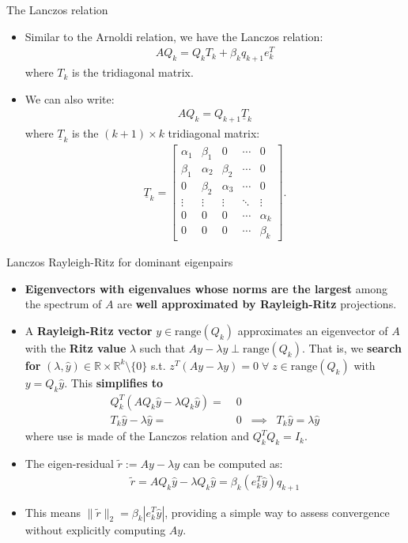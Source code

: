 \documentclass[t,usepdftitle=false]{beamer}
\begin{document}
\begin{frame}{The Lanczos relation}
\begin{itemize}
\item Similar to the Arnoldi relation, we have the Lanczos relation:
\begin{align*}
AQ_k = Q_k T_k + \beta_k q_{k+1}e_k^T
\end{align*}
where $T_k$ is the tridiagonal matrix.
\item We can also write:
\begin{align*}
AQ_k = Q_{k+1}\underline{T}_k
\end{align*}
where $\underline{T}_k$ is the $(k+1) \times k$ tridiagonal matrix:
\begin{align*}
\underline{T}_k =
\begin{bmatrix}
\alpha_1 & \beta_1 & 0 & \cdots & 0 \\
\beta_1 & \alpha_2 & \beta_2 & \cdots & 0 \\
0 & \beta_2 & \alpha_3 & \cdots & 0 \\
\vdots & \vdots & \vdots & \ddots & \vdots \\
0 & 0 & 0 & \cdots & \alpha_k \\
0 & 0 & 0 & \cdots & \beta_k
\end{bmatrix}.
\end{align*}
\end{itemize}
\end{frame}

\begin{frame}{Lanczos Rayleigh-Ritz for dominant eigenpairs}
\begin{itemize}
\item \textbf{Eigenvectors with eigenvalues whose norms are the largest} among the spectrum of $A$ are \textbf{well approximated by Rayleigh-Ritz} projections.
\item A \textbf{Rayleigh-Ritz vector} $y\in\text{range}(Q_k)$ approximates an eigenvector of $A$ with the \textbf{Ritz value} $\lambda$ such that $Ay-\lambda y\perp \text{range}(Q_k)$. That is, we \textbf{search for} $(\lambda,\hat{y})\in\mathbb{R}\times\mathbb{R}^{k}\setminus\{0\}$ s.t. $z^T\left(Ay-\lambda y\right)=0\;\forall\; z\in\text{range}(Q_k)$ with $\!y=Q_k\hat{y}$.
This \textbf{simplifies to}
\begin{align*}
Q_k^T\left(AQ_k\hat{y}-\lambda Q_k\hat{y}\right)=&\;0\\
T_k\hat{y}-\lambda\hat{y}=&\;0
\;\;\implies\;\;
\boxed{T_k\hat{y}=\lambda\hat{y}}
\end{align*}
where use is made of the Lanczos relation and $Q_k^TQ_k=I_k$.
\item The eigen-residual $\tilde{r}:=Ay-\lambda y$ can be computed as:
\begin{align*}
\tilde{r} = AQ_k \hat{y} - \lambda Q_k \hat{y} = \beta_k (e_k^T \hat{y}) q_{k+1}
\end{align*}
\item This means $\|\tilde{r}\|_2 = \beta_k |e_k^T \hat{y}|$, providing a simple way to assess convergence without explicitly computing $Ay$.
\end{itemize}
\end{frame}
\end{document}
